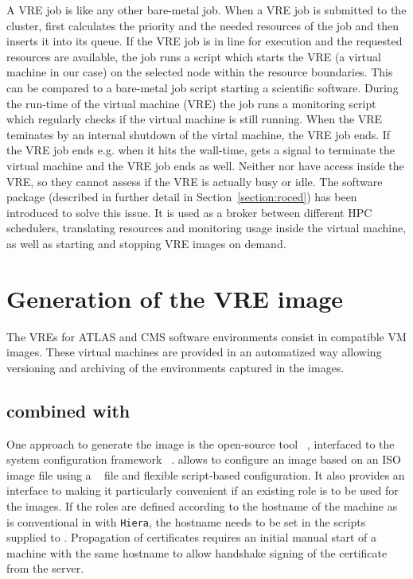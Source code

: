 A VRE job is like any other bare-metal job.
When a VRE job is submitted to the \NEMO cluster, \Moab  first calculates the
priority and the needed resources of the job and then inserts it into its queue.
If the VRE job is in line for execution and the requested resources are available,
the job runs a script which starts the VRE (a virtual machine in our case) on the selected node
within the resource boundaries. This can be compared to a bare-metal job script starting a scientific software.
During the run-time of the virtual machine (VRE) the job runs a monitoring
script which regularly checks if the virtual machine is still running.
When the VRE teminates by an internal shutdown of the virtal machine, the VRE job ends.
If the VRE job ends e.g. when it hits the wall-time, \Openstack gets a signal to terminate the virtual machine and
the VRE job ends as well. Neither \Moab nor \Openstack have access
 inside the VRE, so they cannot assess if the VRE is actually busy or
idle.
The software package \Roced (described in
further detail in Section~\ref{section:roced}) has been introduced to
solve this issue.
It is used as a broker between
different HPC schedulers,  translating resources and monitoring usage inside the
virtual machine, as well as starting and stopping VRE images on demand.

\section{Generation of the VRE image}
The VREs for ATLAS and CMS software environments consist in \Openstack compatible VM images.
These virtual machines are provided in an automatized
way allowing versioning and archiving of the environments captured in
the images.

\subsection{\Packer combined with \Puppet}


One approach to generate the image is the open-source tool
\Packer~\cite{packer}, interfaced to the system configuration framework \Puppet~\cite{puppet}.
\Packer allows to configure an image based on an ISO image file using a \kickstart~\cite{kickstart} file and flexible script-based configuration. 
It also provides an interface to \Puppet making it particularly convenient if an existing \Puppet role is to be used for the images. If the roles are defined according to the hostname of the machine as is conventional in \Puppet with \texttt{Hiera}, the hostname needs to be set in the scripts supplied to \Packer. Propagation of certificates requires an initial manual start of a machine with the same hostname to allow handshake signing of the certificate from the \Puppet server.

